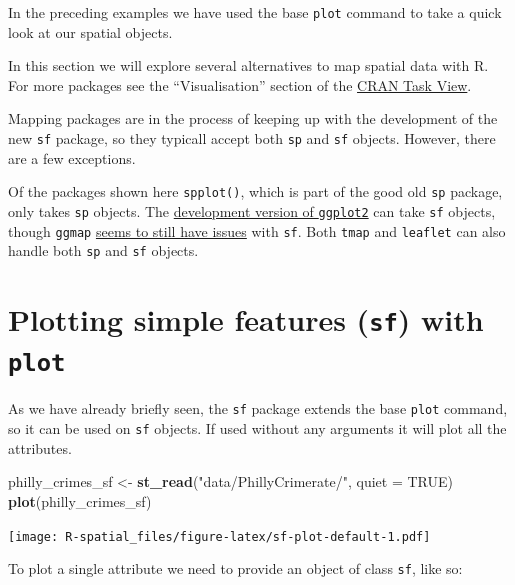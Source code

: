 \documentclass[]{book}
\newenvironment{Shaded}{\begin{snugshade}}{\end{snugshade}}
\newcommand{\KeywordTok}[1]{\textcolor[rgb]{0.13,0.29,0.53}{\textbf{#1}}}
\newcommand{\DataTypeTok}[1]{\textcolor[rgb]{0.13,0.29,0.53}{#1}}
\newcommand{\StringTok}[1]{\textcolor[rgb]{0.31,0.60,0.02}{#1}}
\newcommand{\CommentTok}[1]{\textcolor[rgb]{0.56,0.35,0.01}{\textit{#1}}}
\newcommand{\OtherTok}[1]{\textcolor[rgb]{0.56,0.35,0.01}{#1}}
\newcommand{\OperatorTok}[1]{\textcolor[rgb]{0.81,0.36,0.00}{\textbf{#1}}}
\newcommand{\NormalTok}[1]{#1}
\begin{document}
In the preceding examples we have used the base \texttt{plot} command to
take a quick look at our spatial objects.

In this section we will explore several alternatives to map spatial data
with R. For more packages see the ``Visualisation'' section of the
\href{https://cran.r-project.org/web/views/Spatial.html}{CRAN Task
View}.

Mapping packages are in the process of keeping up with the development
of the new \texttt{sf} package, so they typicall accept both \texttt{sp}
and \texttt{sf} objects. However, there are a few exceptions.

Of the packages shown here \texttt{spplot()}, which is part of the good
old \texttt{sp} package, only takes \texttt{sp} objects. The
\href{https://github.com/tidyverse/ggplot2/releases}{development version
of \texttt{ggplot2}} can take \texttt{sf} objects, though \texttt{ggmap}
\href{https://github.com/tidyverse/ggplot2/issues/2130}{seems to still
have issues} with \texttt{sf}. Both \texttt{tmap} and \texttt{leaflet}
can also handle both \texttt{sp} and \texttt{sf} objects.

\section{\texorpdfstring{Plotting simple features (\texttt{sf}) with
\texttt{plot}}{Plotting simple features (sf) with plot}}\label{plotting-simple-features-sf-with-plot}

As we have already briefly seen, the \texttt{sf} package extends the
base \texttt{plot} command, so it can be used on \texttt{sf} objects. If
used without any arguments it will plot all the attributes.

\begin{Shaded}
\begin{Highlighting}[]
\NormalTok{philly_crimes_sf <-}\StringTok{  }\KeywordTok{st_read}\NormalTok{(}\StringTok{"data/PhillyCrimerate/"}\NormalTok{, }\DataTypeTok{quiet =} \OtherTok{TRUE}\NormalTok{)}
\KeywordTok{plot}\NormalTok{(philly_crimes_sf)}
\end{Highlighting}
\end{Shaded}

\texttt{[image: R-spatial\_files/figure-latex/sf-plot-default-1.pdf]}

To plot a single attribute we need to provide an object of class
\texttt{sf}, like so:

\begin{Shaded}
\end{Shaded}
\end{document}
